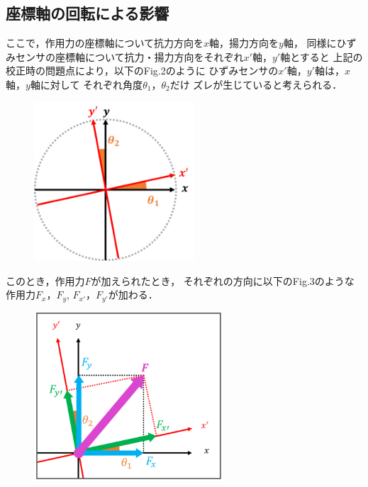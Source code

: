 \documentclass[twocolumn,a4j]{jsarticle}
\begin{document}
\subsection{座標軸の回転による影響}
ここで，作用力の座標軸について抗力方向を$x軸$，揚力方向を$y$軸，
同様にひずみセンサの座標軸について抗力・揚力方向をそれぞれ$x'$軸，$y'$軸とすると
上記の校正時の問題点により，以下のFig.2のように
ひずみセンサの$x'$軸，$y'$軸は，$x$軸，$y$軸に対して
それぞれ角度$\theta_1$，$\theta_2$だけ
ズレが生じていると考えられる．\\

\begin{figure}[htbp]
    \footnotesize
    \begin{center}
        \includegraphics[width=60mm]{../images/image_1.png}
        \caption{}
    \end{center}
\end{figure}

\newpage

このとき，作用力$F$が加えられたとき，
それぞれの方向に以下のFig.3のような作用力$F_x$，$F_y$, $F_{x'}$，$F_{y'}$が加わる．

\begin{figure}[htbp]
    \footnotesize
    \begin{center}
        \includegraphics[width=70mm]{../images/image_2.png}
        \caption{}
    \end{center}
\end{figure}
\end{document}
